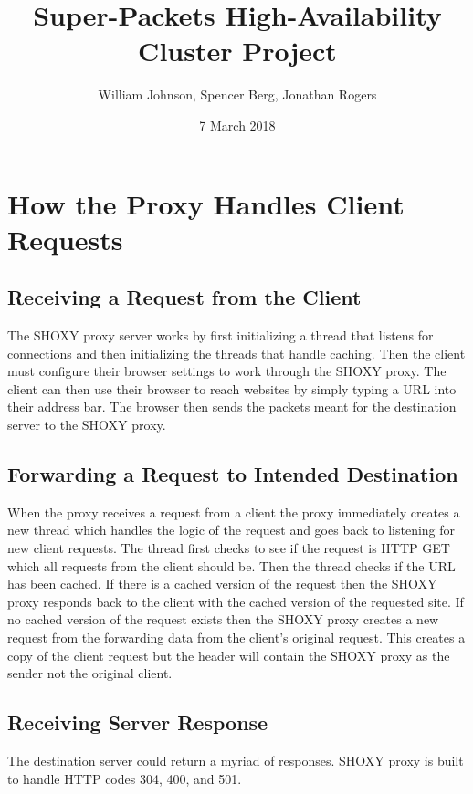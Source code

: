\documentclass[11pt]{article}
\title{Super-Packets High-Availability Cluster Project}
\author{William Johnson, Spencer Berg,  Jonathan Rogers}
\date{7 March 2018}
\begin{document}
\maketitle

\thispagestyle{empty}

\begin{doublespace}



\end{doublespace}

\section{How the Proxy Handles Client Requests}
\subsection{Receiving a Request from the Client}
The SHOXY proxy server works by first initializing a thread that listens for connections and then initializing the threads that handle caching. Then the client must configure their browser settings to work through the SHOXY proxy. The client can then use their browser to reach websites by simply typing a URL into their address bar. The browser then sends the packets meant for the destination server to the SHOXY proxy. 

\subsection{Forwarding a Request to Intended Destination}
When the proxy receives a request from a client the proxy immediately creates a new thread which handles the logic of the request and goes back to listening for new client requests. The thread first checks to see if the request is HTTP GET which all requests from the client should be. Then the thread checks if the URL has been cached. If there is a cached version of the request then the SHOXY proxy responds back to the client with the cached version of the requested site. If no cached version of the request exists then the SHOXY proxy creates a new request from the forwarding data from the client's original request. This creates a copy of the client request but the header will contain the SHOXY proxy as the sender not the original client. 

\subsection{Receiving Server Response}
The destination server could return a myriad of responses. SHOXY proxy is built to handle HTTP codes 304, 400, and 501. 
\end{document}
